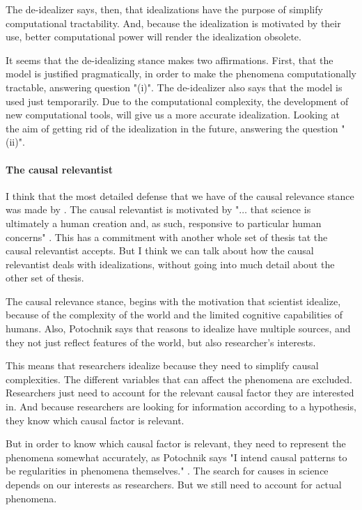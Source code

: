 The de-idealizer says, then, that idealizations have the purpose of simplify computational tractability.
And, because the idealization is motivated by their use, better computational power will render the idealization obsolete.

It seems that the de-idealizing stance makes two affirmations.
First, that the model is justified pragmatically, in order to make the phenomena computationally tractable, answering question "(i)".
The de-idealizer also says that the model is used just temporarily.
Due to the computational complexity, the development of new computational tools, will give us a more accurate idealization.
Looking at the aim of getting rid of the idealization in the future, answering the question "(ii)".

\paragraph{The causal relevantist}

I think that the most detailed defense that we have of the causal relevance stance was made by \cite{Potochnik2017-POTIAT-3}.
The causal relevantist is motivated by "$\ldots$ that science is ultimately a human creation and, as such, responsive to particular human concerns" \parencite[][p. 11]{Potochnik2017-POTIAT-3}.
This has a commitment with another whole set of thesis tat the causal relevantist accepts.
But I think we can talk about how the causal relevantist deals with idealizations, without going into much detail about the other set of thesis.

The causal relevance stance, begins with the motivation that scientist idealize, because of the complexity of the world and the limited cognitive capabilities of humans.
Also, Potochnik says that reasons to idealize have multiple sources, and they not just reflect features of the world, but also researcher's interests.

This means that researchers idealize because they need to simplify causal complexities.
The different variables that can affect the phenomena are excluded.
Researchers just need to account for the relevant causal factor they are interested in.
And because researchers are looking for information according to a hypothesis, they know which causal factor is relevant.

But in order to know which causal factor is relevant, they need to represent the phenomena somewhat accurately, as Potochnik says "I intend causal patterns to be regularities in phenomena themselves." \parencite[][p. 25]{Potochnik2017-POTIAT-3}.
The search for causes in science depends on our interests as researchers.
But we still need to account for actual phenomena.

